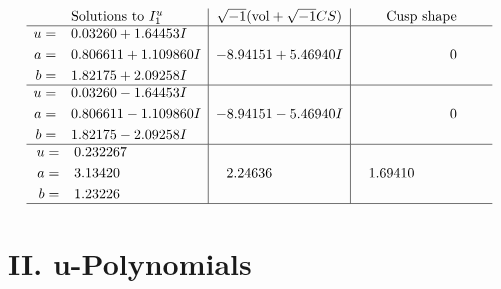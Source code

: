 \documentclass[1p]{elsarticle_modified}
\theoremstyle{definition}
\newcommand{\I}{\sqrt{-1}}
\begin{document}
$$\begin{array}{c|c|c}
\text{Solutions to }I^u_{1}& \I (\text{vol} + \sqrt{-1}CS) & \text{Cusp shape}\\
 \hline 
\begin{aligned}
u &= \phantom{-}0.03260 + 1.64453 I \\
a &= \phantom{-}0.806611 + 1.109860 I \\
b &= \phantom{-}1.82175 + 2.09258 I\end{aligned}
 & -8.94151 + 5.46940 I & \phantom{-0.000000 } 0 \\ \hline\begin{aligned}
u &= \phantom{-}0.03260 - 1.64453 I \\
a &= \phantom{-}0.806611 - 1.109860 I \\
b &= \phantom{-}1.82175 - 2.09258 I\end{aligned}
 & -8.94151 - 5.46940 I & \phantom{-0.000000 } 0 \\ \hline\begin{aligned}
u &= \phantom{-}0.232267\phantom{ +0.000000I} \\
a &= \phantom{-}3.13420\phantom{ +0.000000I} \\
b &= \phantom{-}1.23226\phantom{ +0.000000I}\end{aligned}
 & \phantom{-}2.24636\phantom{ +0.000000I} & \phantom{-}1.69410\phantom{ +0.000000I}\\
 \hline 
 \end{array}$$\newpage
\newpage\renewcommand{\arraystretch}{1}
\centering \section*{ II. u-Polynomials}
\end{document}
